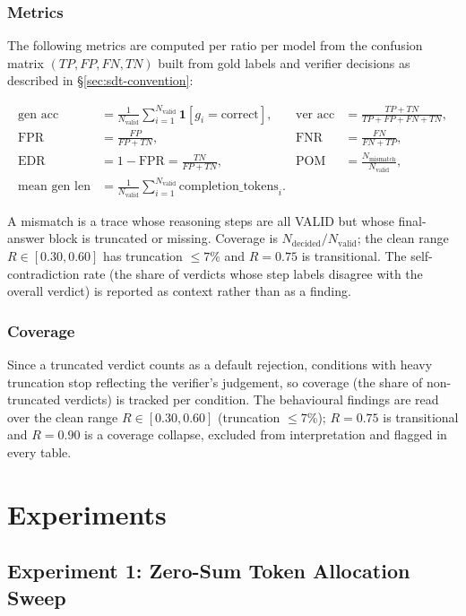 \documentclass[12pt, a4paper, oneside]{report}
\begin{document}
\subsection{Metrics}\label{sec:metrics}
The following metrics are computed per ratio per model from the confusion matrix $(TP, FP, FN, TN)$ built from gold labels and verifier decisions as described in \S\ref{sec:sdt-convention}:

\[
\begin{aligned}
\text{gen acc} &= \frac{1}{N_{\text{valid}}} \sum_{i=1}^{N_{\text{valid}}} \mathbf{1}[g_i = \text{correct}], &
\text{ver acc} &= \frac{TP + TN}{TP + FP + FN + TN}, \\[4pt]
\text{FPR} &= \frac{FP}{FP + TN}, &
\text{FNR} &= \frac{FN}{FN + TP}, \\[4pt]
\text{EDR} &= 1 - \text{FPR} = \frac{TN}{FP + TN}, &
\text{POM} &= \frac{N_{\text{mismatch}}}{N_{\text{valid}}}, \\[4pt]
\text{mean gen len} &= \frac{1}{N_{\text{valid}}} \sum_{i=1}^{N_{\text{valid}}} \text{completion\_tokens}_i.
\end{aligned}
\]

A mismatch is a trace whose reasoning steps are all VALID but whose final-answer block is truncated or missing. Coverage is $N_{\text{decided}} / N_{\text{valid}}$; the clean range $R \in [0.30, 0.60]$ has truncation $\leq 7\%$ and $R = 0.75$ is transitional. The self-contradiction rate (the share of verdicts whose step labels disagree with the overall verdict) is reported as context rather than as a finding.

\subsection{Coverage}
Since a truncated verdict counts as a default rejection, conditions with heavy truncation stop reflecting the verifier's judgement, so coverage (the share of non-truncated verdicts) is tracked per condition. The behavioural findings are read over the clean range $R \in [0.30, 0.60]$ (truncation $\leq 7\%$); $R = 0.75$ is transitional and $R = 0.90$ is a coverage collapse, excluded from interpretation and flagged in every table.

\chapter{ Experiments}

\section{ Experiment 1: Zero-Sum Token Allocation Sweep }
\end{document}
